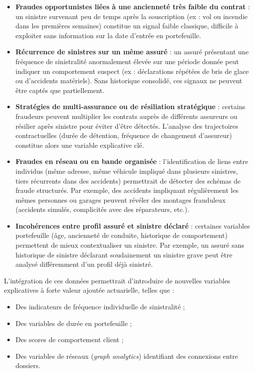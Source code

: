 \begin{itemize}[label = $\bullet$]
    \item \textbf{Fraudes opportunistes liées à une ancienneté très faible du contrat} : un sinistre survenant peu de temps après la souscription (ex : vol ou incendie dans les premières semaines) constitue un signal faible classique, difficile à exploiter sans information sur la date d'entrée en portefeuille.
    \item \textbf{Récurrence de sinistres sur un même assuré} : un assuré présentant une fréquence de sinistralité anormalement élevée sur une période donnée peut indiquer un comportement suspect (ex : déclarations répétées de bris de glace ou d'accidents matériels). Sans historique consolidé, ces signaux ne peuvent être captés que partiellement.
    \item \textbf{Stratégies de multi-assurance ou de résiliation stratégique} : certains fraudeurs peuvent multiplier les contrats auprès de différents assureurs ou résilier après sinistre pour éviter d'être détectés. L'analyse des trajectoires contractuelles (durée de détention, fréquence de changement d'assureur) constitue alors une variable explicative clé.
    \item \textbf{Fraudes en réseau ou en bande organisée} : l'identification de liens entre individus (même adresse, même véhicule impliqué dans plusieurs sinistres, tiers récurrents dans des accidents) permettrait de détecter des schémas de fraude structurés. Par exemple, des accidents impliquant régulièrement les mêmes personnes ou garages peuvent révéler des montages frauduleux (accidents simulés, complicités avec des réparateurs, etc.).
    \item \textbf{Incohérences entre profil assuré et sinistre déclaré} : certaines variables portefeuille (âge, ancienneté de conduite, historique de comportement) permettent de mieux contextualiser un sinistre. Par exemple, un assuré sans historique de sinistre déclarant soudainement un sinistre grave peut être analysé différemment d'un profil déjà sinistré.
\end{itemize}

L'intégration de ces données permettrait d'introduire de nouvelles variables explicatives à forte valeur ajoutée actuarielle, telles que :

\begin{itemize}[label = $\bullet$]
    \item Des indicateurs de fréquence individuelle de sinistralité ;
    \item Des variables de durée en portefeuille ;
    \item Des scores de comportement client ;
    \item Des variables de réseaux (\textit{graph analytics}) identifiant des connexions entre dossiers.
\end{itemize}

